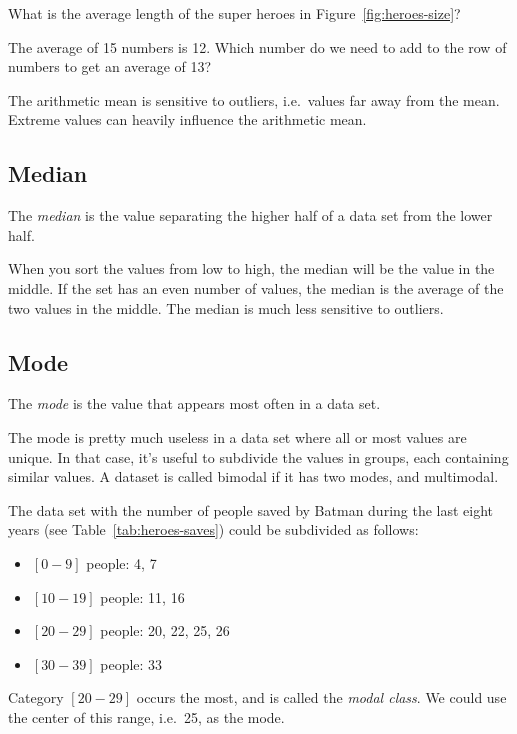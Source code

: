 \begin{exercise}
  What is the average length of the super heroes in Figure~\ref{fig:heroes-size}?
\end{exercise}

\begin{exercise}
  The average of 15 numbers is 12. Which number do we need to add to the row of numbers to get an average of 13?
\end{exercise}

The arithmetic mean is sensitive to outliers, i.e.~values far away from the mean. Extreme values can heavily influence the arithmetic mean.

\subsection{Median}
\label{ssec:median}

\begin{definition}[Median]
  The \emph{median} is the value separating the higher half of a data set from the lower half.
\end{definition}

When you sort the values from low to high, the median will be the value in the middle. If the set has an even number of values, the median is the average of the two values in the middle. The median is much less sensitive to outliers.

\subsection{Mode}
\label{ssec:mode}

\begin{definition}[Mode]
  The \emph{mode} is the value that appears most often in a data set.
\end{definition}

The mode is pretty much useless in a data set where all or most values are unique. In that case, it's useful to subdivide the values in groups, each containing similar values. A dataset is called bimodal if it has two modes, and multimodal.

\begin{example}
  The data set with the number of people saved by Batman during the last eight years (see Table~\ref{tab:heroes-saves}) could be subdivided as follows:
  
  \begin{itemize}
    \item $[0-9]$ people: 4, 7
    \item $[10-19]$ people: 11, 16
    \item $[20-29]$ people: 20, 22, 25, 26
    \item $[30-39]$ people: 33
  \end{itemize}
  
  Category $[20-29]$ occurs the most, and is called the \emph{modal class}. We could use the center of this range, i.e.~25, as the mode.
\end{example}

